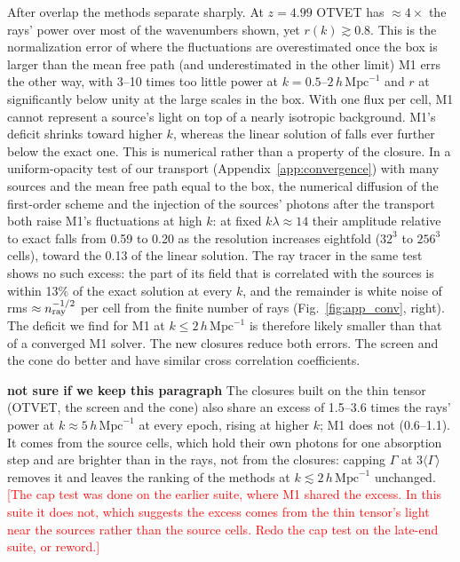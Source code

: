 \documentclass[iop]{openjournal}
\newcommand{\hmpc}{\,h\,\mathrm{Mpc}^{-1}}
\begin{document}
After overlap the methods separate sharply. At $z=4.99$ OTVET has
$\approx 4\times$ the rays' power over most of the wavenumbers shown, yet $r(k) \gtrsim 0.8$. This
is the normalization error of \citet{wu21} where the fluctuations are overestimated once the box is larger than the mean free path (and underestimated in the other limit)  M1 errs the other way, with 3--10
times too little power at $k=0.5$--$2\hmpc$ and $r$ at significantly below unity at the large scales in the box. With one flux per cell, M1 cannot represent a source's light on top of a
nearly isotropic background. M1's deficit shrinks toward higher $k$, whereas the linear solution of \citet{wu21} falls ever further below the exact one. This is numerical rather than a property of the closure. In a uniform-opacity test of our transport (Appendix~\ref{app:convergence}) with many sources and the mean free path equal to the box, the numerical diffusion of the first-order scheme and the injection of the sources' photons after the transport both raise M1's fluctuations at high $k$: at fixed $k\lambda\approx14$ their amplitude relative to exact falls from 0.59 to 0.20 as the resolution increases eightfold ($32^3$ to $256^3$ cells), toward the 0.13 of the linear solution. The ray tracer in the same test shows no such excess: the part of its field that is correlated with the sources is within 13\% of the exact solution at every $k$, and the remainder is white noise of rms $\approx n_{\rm ray}^{-1/2}$ per cell from the finite number of rays (Fig.~\ref{fig:app_conv}, right). The deficit we find for M1 at $k\le2\hmpc$ is therefore likely smaller than that of a converged M1 solver. The new closures reduce both errors. The
screen and the cone do better and have similar cross correlation coefficients.

{\bf not sure if we keep this paragraph} The closures built on the thin tensor (OTVET, the screen and the cone) also share an excess of 1.5--3.6 times the rays' power at $k\approx5\hmpc$ at every epoch,
rising at higher $k$; M1 does not (0.6--1.1). It comes from the source cells, which hold their
own photons for one absorption step and are brighter than in the rays,
not from the closures: capping $\Gamma$ at $3\langle\Gamma\rangle$
removes it and leaves the ranking of the methods at $k\lesssim2\hmpc$ unchanged. \textcolor{red}{[The cap test was done on the earlier suite, where M1 shared the excess. In this suite it does not, which suggests the excess comes from the thin tensor's light near the sources rather than the source cells. Redo the cap test on the late-end suite, or reword.]} 
\end{document}
